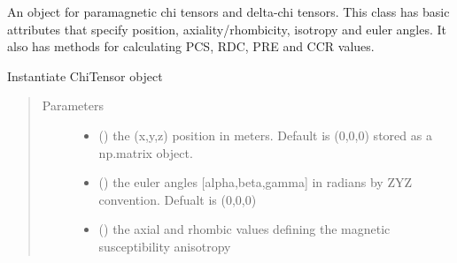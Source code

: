 \documentclass[a4paper,10pt,english,openany,oneside]{sphinxmanual}
\begin{document}
\begin{fulllineitems}
\label{\detokenize{reference/generated/paramagpy.metal.Metal:paramagpy.metal.Metal}}
An object for paramagnetic chi tensors and delta-chi tensors.
This class has basic attributes that specify position,
axiality/rhombicity, isotropy and euler angles.
It also has methods for calculating PCS, RDC, PRE and CCR values.

\begin{fulllineitems}
\label{\detokenize{reference/generated/paramagpy.metal.Metal:paramagpy.metal.Metal.__init__}}
Instantiate ChiTensor object
\begin{quote}\begin{description}
\item[{Parameters}] \leavevmode\begin{itemize}
\item {} 
 (\sphinxstyleliteralemphasis{\sphinxupquote{, }}) \textendash{} the (x,y,z) position in meters. Default is (0,0,0)
stored as a np.matrix object.

\item {} 
 (\sphinxstyleliteralemphasis{\sphinxupquote{, }}) \textendash{} the euler angles {[}alpha,beta,gamma{]} in radians
by ZYZ convention. Defualt is (0,0,0)

\item {} 
 (\sphinxstyleliteralemphasis{\sphinxupquote{, }}) \textendash{} the axial and rhombic values defining the magnetic susceptibility
anisotropy


\end{itemize}
\end{description}
\end{quote}
\end{fulllineitems}
\end{fulllineitems}
\end{document}
